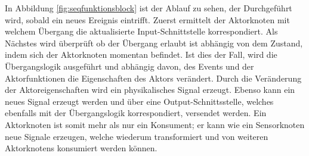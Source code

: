 In Abbildung \ref{fig:seqfunktionsblock} ist der Ablauf zu sehen, der Durchgeführt wird, sobald ein neues Ereignis eintrifft. Zuerst ermittelt der Aktorknoten mit welchem Übergang die aktualisierte Input-Schnittstelle korrespondiert. Als Nächstes wird überprüft ob der Übergang erlaubt ist abhängig von dem Zustand, indem sich der Aktorknoten momentan befindet. Ist dies der Fall, wird die Übergangslogik ausgeführt und abhängig davon, des Events und der Aktorfunktionen die Eigenschaften des Aktors verändert. Durch die Veränderung der Aktoreigenschaften wird ein physikalisches Signal erzeugt. Ebenso kann ein neues Signal erzeugt werden und über eine Output-Schnittsstelle, welches ebenfalls mit der Übergangslogik korrespondiert, versendet werden. Ein Aktorknoten ist somit mehr als nur ein Konsument; er kann wie ein Sensorknoten neue Signale erzeugen, welche wiederum transformiert und von weiteren Aktorknotens konsumiert werden können.

